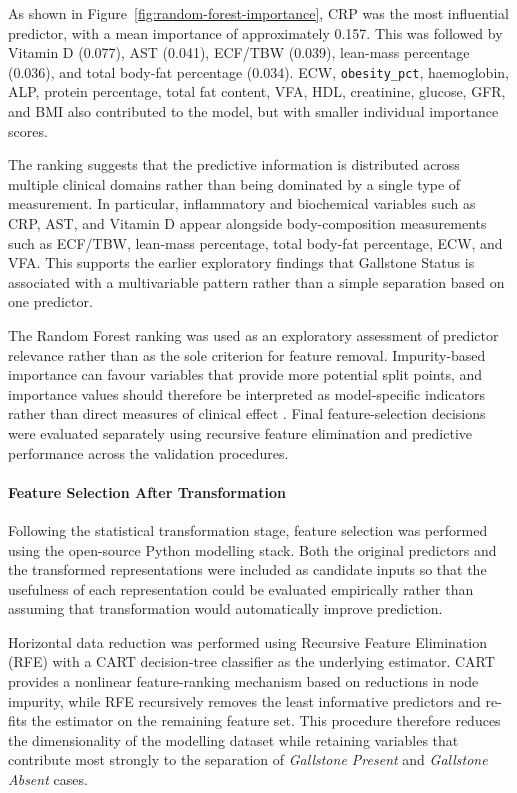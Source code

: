 As shown in Figure~\ref{fig:random-forest-importance}, CRP was the most
influential predictor, with a mean importance of approximately 0.157. This was
followed by Vitamin D (0.077), AST (0.041), ECF/TBW (0.039), lean-mass
percentage (0.036), and total body-fat percentage (0.034). ECW,
\texttt{obesity\_pct}, haemoglobin, ALP, protein percentage, total fat content,
VFA, HDL, creatinine, glucose, GFR, and BMI also contributed to the model, but
with smaller individual importance scores.

The ranking suggests that the predictive information is distributed across
multiple clinical domains rather than being dominated by a single type of
measurement. In particular, inflammatory and biochemical variables such as CRP,
AST, and Vitamin D appear alongside body-composition measurements such as
ECF/TBW, lean-mass percentage, total body-fat percentage, ECW, and VFA. This
supports the earlier exploratory findings that Gallstone Status is associated
with a multivariable pattern rather than a simple separation based on one
predictor.

The Random Forest ranking was used as an exploratory assessment of predictor
relevance rather than as the sole criterion for feature removal. Impurity-based
importance can favour variables that provide more potential split points, and
importance values should therefore be interpreted as model-specific indicators
rather than direct measures of clinical effect \parencite{pedregosa2011scikit}.
Final feature-selection decisions were evaluated separately using recursive
feature elimination and predictive performance across the validation
procedures.


\paragraph{Feature Selection After Transformation}
\label{subsubsec:post-transform-selection}

Following the statistical transformation stage, feature selection was performed
using the open-source Python modelling stack. Both the original predictors and
the transformed representations were included as candidate inputs so that the
usefulness of each representation could be evaluated empirically rather than
assuming that transformation would automatically improve prediction.

Horizontal data reduction was performed using Recursive Feature Elimination
(RFE) with a CART decision-tree classifier as the underlying estimator. CART
provides a nonlinear feature-ranking mechanism based on reductions in node
impurity, while RFE recursively removes the least informative predictors and
re-fits the estimator on the remaining feature set. This procedure therefore
reduces the dimensionality of the modelling dataset while retaining variables
that contribute most strongly to the separation of
\textit{Gallstone Present} and \textit{Gallstone Absent} cases.

